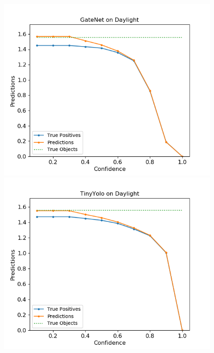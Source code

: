 \documentclass{article}
\begin{document}
\begin{figure}
	\centering
	\begin{minipage}{0.30\linewidth}
		\includegraphics[width=\linewidth]{fig/detection_gate}
	\end{minipage}
	\begin{minipage}{0.30\linewidth}
		\includegraphics[width=\linewidth]{fig/detection_tiny}
	\end{minipage}
	\begin{minipage}{0.30\linewidth}

\end{minipage}
\end{figure}
\end{document}

